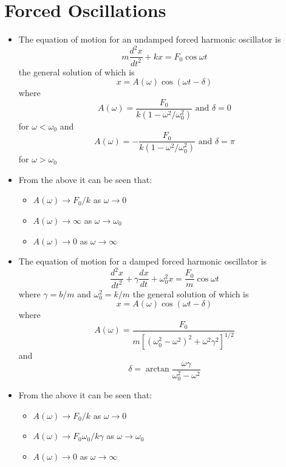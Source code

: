\documentclass{article}
\begin{document}
\section{Forced Oscillations}

\begin{itemize}
  \item The equation of motion for an undamped forced harmonic oscillator is \[m \frac{d^2 x}{d t^2} + k x = F_0 \cos \omega t\] the general solution of which is \[x = A(\omega) \cos (\omega t - \delta)\] where \[A(\omega) = \frac{F_0}{k (1 - \omega^2 / \omega_0^2)} \text{ and } \delta = 0\] for $\omega < \omega_0$ and \[A(\omega) = -\frac{F_0}{k (1 - \omega^2 / \omega_0^2)} \text{ and } \delta = \pi\] for $\omega > \omega_0$

  \item From the above it can be seen that:

        \begin{itemize}
          \item $A(\omega) \rightarrow F_0 / k$ as $\omega \rightarrow 0$

          \item $A(\omega) \rightarrow \infty$ as $\omega \rightarrow \omega_0$

          \item $A(\omega) \rightarrow 0$ as $\omega \rightarrow \infty$
        \end{itemize}

  \item The equation of motion for a damped forced harmonic oscillator is \[\frac{d^2 x}{d t^2} + \gamma \frac{d x}{d t} + \omega_0^2 x = \frac{F_0}{m} \cos \omega t\] where $\gamma = b / m$ and $\omega_0^2 = k / m$ the general solution of which is \[x = A(\omega) \cos (\omega t - \delta)\] where \[A(\omega) = \frac{F_0}{m [(\omega_0^2 - \omega^2)^2 + \omega^2 \gamma^2]^{1 / 2}}\] and \[\delta = \arctan \frac{\omega \gamma}{\omega_0^2 - \omega^2}\]

  \item From the above it can be seen that:

        \begin{itemize}
          \item $A(\omega) \rightarrow F_0 / k$ as $\omega \rightarrow 0$

          \item $A(\omega) \rightarrow F_0 \omega_0 / k \gamma$ as $\omega \rightarrow \omega_0$

          \item $A(\omega) \rightarrow 0$ as $\omega \rightarrow \infty$
        \end{itemize}


\end{itemize}
\end{document}

